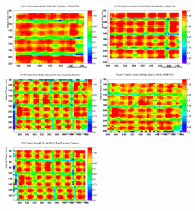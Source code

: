 \documentclass[hidelinks,11pt]{article}
\numberwithin{figure}{section}
\numberwithin{table}{section}
\begin{document}
\begin{figure}[hbtp]
\begin{center}
\includegraphics[width=0.45\textwidth]{Plots/2017/2nd/Normalized.png}
\includegraphics[width=0.45\textwidth]{Plots/2017/3rd/Normalized.png}
\includegraphics[width=0.45\textwidth]{Plots/2018/3rd/Normalized.png}
\includegraphics[width=0.45\textwidth]{Plots/2018/4th/Normalized.png}
\includegraphics[width=0.45\textwidth]{Plots/2018/5th/Normalized.png}

\end{center}
\end{figure}
\end{document}
